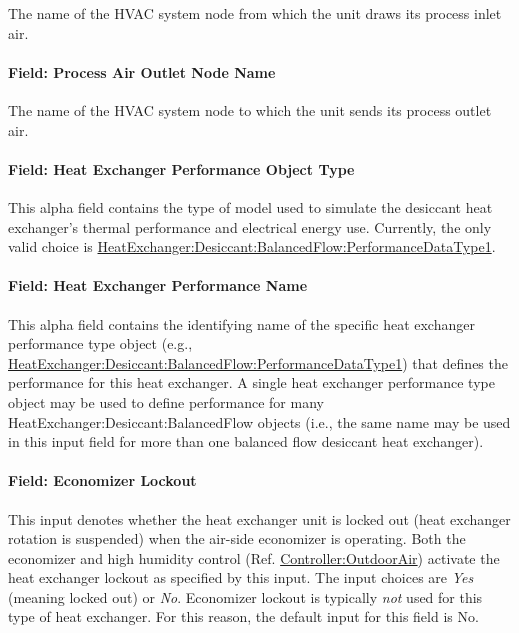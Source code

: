 The name of the HVAC system node from which the unit draws its process inlet air.

\paragraph{Field: Process Air Outlet Node Name}\label{field-process-air-outlet-node-name-000}

The name of the HVAC system node to which the unit sends its process outlet air.

\paragraph{Field: Heat Exchanger Performance Object Type}\label{field-heat-exchanger-performance-object-type}

This alpha field contains the type of model used to simulate the desiccant heat exchanger's thermal performance and electrical energy use. Currently, the only valid choice is \hyperref[heatexchangerdesiccantbalancedflowperformancedatatype1]{HeatExchanger:Desiccant:BalancedFlow:PerformanceDataType1}.

\paragraph{Field: Heat Exchanger Performance Name}\label{field-heat-exchanger-performance-name}

This alpha field contains the identifying name of the specific heat exchanger performance type object (e.g., \hyperref[heatexchangerdesiccantbalancedflowperformancedatatype1]{HeatExchanger:Desiccant:BalancedFlow:PerformanceDataType1}) that defines the performance for this heat exchanger. A single heat exchanger performance type object may be used to define performance for many HeatExchanger:Desiccant:BalancedFlow objects (i.e., the same name may be used in this input field for more than one balanced flow desiccant heat exchanger).

\paragraph{Field: Economizer Lockout}\label{field-economizer-lockout-2}

This input denotes whether the heat exchanger unit is locked out (heat exchanger rotation is suspended) when the air-side economizer is operating. Both the economizer and high humidity control (Ref. \hyperref[controlleroutdoorair]{Controller:OutdoorAir}) activate the heat exchanger lockout as specified by this input. The input choices are \emph{Yes} (meaning locked out) or \emph{No}. Economizer lockout is typically \emph{not} used for this type of heat exchanger. For this reason, the default input for this field is No.

